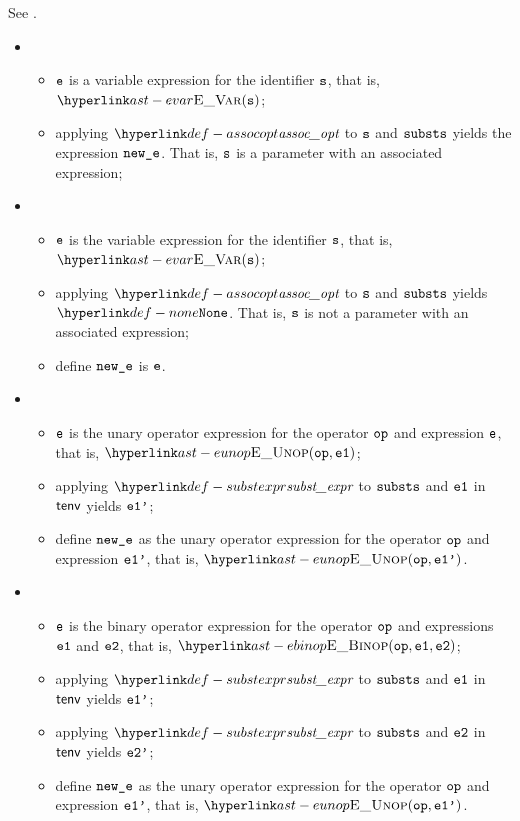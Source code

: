 See .

\ProseParagraph
\OneApplies
\begin{itemize}
  \item {}
  \begin{itemize}
    \item $\texttt{e}$ is a variable expression for the identifier $\texttt{s}$, that is, $\EVar(\vs)$;
    \item applying $\assocopt$ to $\texttt{s}$ and $\texttt{substs}$ yields the expression $\texttt{new\_e}$.
          That is, $\texttt{s}$ is a parameter with an associated expression;
  \end{itemize}

  \item {}
  \begin{itemize}
    \item $\texttt{e}$ is the variable expression for the identifier $\texttt{s}$, that is, $\EVar(\vs)$;
    \item applying $\assocopt$ to $\texttt{s}$ and $\texttt{substs}$ yields $\None$.
          That is, $\texttt{s}$ is not a parameter with an associated expression;
    \item define $\texttt{new\_e}$ is $\texttt{e}$.
  \end{itemize}

  \item {}
  \begin{itemize}
    \item $\texttt{e}$ is the unary operator expression for the operator $\texttt{op}$ and expression $\texttt{e}$, that is, $\EUnop(\op, \veone)$;
    \item applying $\substexpr$ to $\texttt{substs}$ and $\texttt{e1}$ in $\textsf{tenv}$ yields $\texttt{e1'}$;
    \item define $\texttt{new\_e}$ as the unary operator expression for the operator $\texttt{op}$ and expression $\texttt{e1'}$, that is, $\EUnop(\op, \veonep)$.
  \end{itemize}

  \item {}
  \begin{itemize}
    \item $\texttt{e}$ is the binary operator expression for the operator $\texttt{op}$ and expressions $\texttt{e1}$ and $\texttt{e2}$, that is, $\EBinop(\op, \veone, \vetwo)$;
    \item applying $\substexpr$ to $\texttt{substs}$ and $\texttt{e1}$ in $\textsf{tenv}$ yields $\texttt{e1'}$;
    \item applying $\substexpr$ to $\texttt{substs}$ and $\texttt{e2}$ in $\textsf{tenv}$ yields $\texttt{e2'}$;
    \item define $\texttt{new\_e}$ as the unary operator expression for the operator $\texttt{op}$ and expression $\texttt{e1'}$, that is, $\EUnop(\op, \veonep)$.
  \end{itemize}


\end{itemize}
